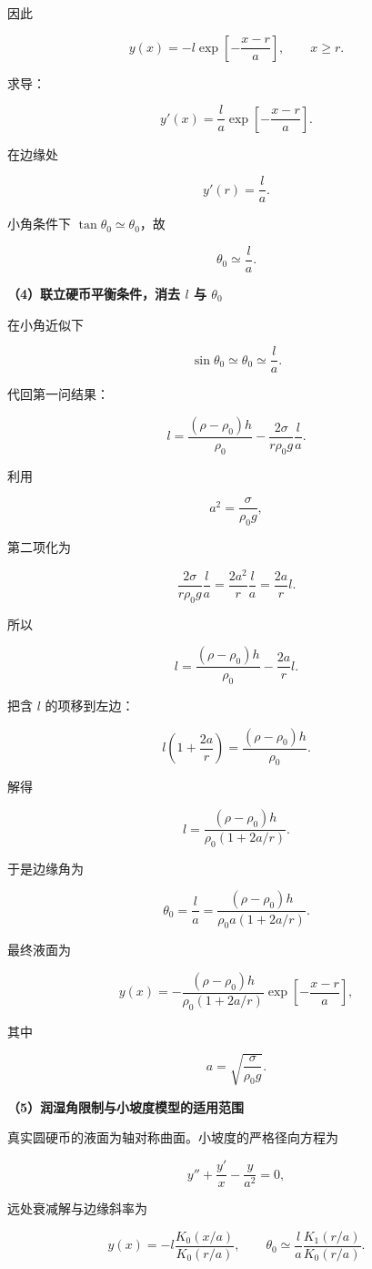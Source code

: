 \documentclass[12pt,a4paper,UTF8]{ctexart}
\begin{document}
因此

\[
\boxed{
y(x)=-l\exp\left[-\frac{x-r}{a}\right]
},
\qquad x\ge r.
\]

求导：

\[
y'(x)=\frac{l}{a}
\exp\left[-\frac{x-r}{a}\right].
\]

在边缘处

\[y'(r)=\frac la.\]

小角条件下 \(\tan\theta_0\simeq\theta_0\)，故

\[
\boxed{\theta_0\simeq\frac la}.
\]

\textbf{（4）联立硬币平衡条件，消去 \(l\) 与 \(\theta_0\)}

在小角近似下

\[\sin\theta_0\simeq\theta_0\simeq\frac la.\]

代回第一问结果：

\[
l=\frac{(\rho-\rho_0)h}{\rho_0}
-\frac{2\sigma}{r\rho_0g}\frac la.
\]

利用

\[a^2=\frac{\sigma}{\rho_0g},\]

第二项化为

\[
\frac{2\sigma}{r\rho_0g}\frac la
=\frac{2a^2}{r}\frac la
=\frac{2a}{r}l.
\]

所以

\[
l=\frac{(\rho-\rho_0)h}{\rho_0}-\frac{2a}{r}l.
\]

把含 \(l\) 的项移到左边：

\[
l\left(1+\frac{2a}{r}\right)
=\frac{(\rho-\rho_0)h}{\rho_0}.
\]

解得

\[
\boxed{
l=
\frac{(\rho-\rho_0)h}
{\rho_0\left(1+2a/r\right)}
}.
\]

于是边缘角为

\[
\boxed{
\theta_0=\frac la
=\frac{(\rho-\rho_0)h}
{\rho_0a\left(1+2a/r\right)}
}.
\]

最终液面为

\[
\boxed{
y(x)=
-\frac{(\rho-\rho_0)h}
{\rho_0\left(1+2a/r\right)}
\exp\left[-\frac{x-r}{a}\right]
},
\]

其中

\[
\boxed{a=\sqrt{\frac{\sigma}{\rho_0g}}}.
\]

\textbf{（5）润湿角限制与小坡度模型的适用范围}

真实圆硬币的液面为轴对称曲面。小坡度的严格径向方程为

\[y''+\frac{y'}x-\frac y{a^2}=0,\]

远处衰减解与边缘斜率为

\[y(x)=-l\frac{K_0(x/a)}{K_0(r/a)},\qquad
\theta_0\simeq\frac la\frac{K_1(r/a)}{K_0(r/a)}.\]
\end{document}
